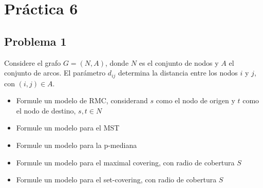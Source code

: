 \documentclass[letterpaper]{article}
\begin{document}
\vspace*{0.1\baselineskip}
\section*{Práctica 6}
\subsection*{Problema 1}
Considere el grafo $G=(N,A)$, donde $N$ es el conjunto de nodos y $A$ el conjunto de arcos. El parámetro $d_{ij}$ determina la distancia entre los nodos $i$ y $j$, con $(i,j) \in A$.

\begin{itemize}
\item Formule un modelo de RMC, considerand $s$ como el nodo de origen y $t$ como el nodo de destino, $s,t \in N$
\item Formule un modelo para el MST
\item Formule un modelo para la p-mediana
\item Formule un modelo para el maximal covering, con radio de cobertura $S$
\item Formule un modelo para el set-covering, con radio de cobertura $S$
\end{itemize}
\end{document}
